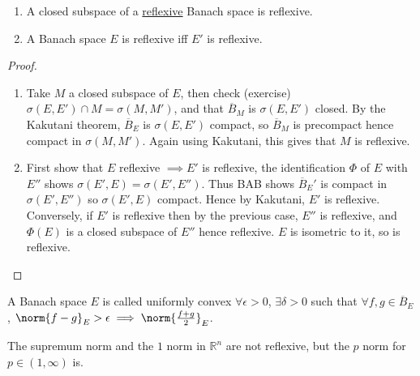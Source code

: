 \documentclass[twoside]{article}
\begin{document}
\begin{cor}\leavevmode
    \begin{enumerate}[label=(\roman*)]
        \item A closed subspace of a \hyperlink{def:refl}{reflexive} Banach space is reflexive.
        \item A Banach space $E$ is reflexive iff $E'$ is reflexive.
    \end{enumerate}
\end{cor}
\begin{proof}\leavevmode
    \begin{enumerate}[label=(\roman*)]
        \item Take $M$ a closed subspace of $E$, then check (exercise) $\sigma(E, E') \cap M = \sigma(M, M')$, and that $\overline{B}_M$ is $\sigma(E, E')$ closed.
            By the Kakutani theorem, $\overline{B}_E$ is $\sigma(E, E')$ compact, so $\overline{B}_M$ is precompact hence compact in $\sigma(M, M')$.
            Again using Kakutani, this gives that $M$ is reflexive.
        \item First show that $E$ reflexive $\implies E'$ is reflexive, the identification $\Phi$ of $E$ with $E''$ shows $\sigma(E', E) = \sigma(E', E'')$.
            Thus BAB shows $\overline{B}_E'$ is compact in $\sigma(E', E'')$ so $\sigma(E', E)$ compact. Hence by Kakutani, $E'$ is reflexive.
            Conversely, if $E'$ is reflexive then by the previous case, $E''$ is reflexive, and $\Phi(E)$ is a closed subspace of $E''$ hence reflexive.
            $E$ is isometric to it, so is reflexive.
    \end{enumerate}
\end{proof}

\begin{defi}
    A Banach space $E$ is called uniformly convex $\forall \epsilon > 0$, $\exists \delta > 0$ such that $\forall f, g \in \overline{B}_E$, $\norm{f-g}_E > \epsilon \implies \norm{\frac{f+g}{2}}_E$.
\end{defi}
\begin{eg}
  The supremum norm and the $1$ norm in $\mathbb{R}^n$ are not reflexive, but the $p$ norm for $p \in (1, \infty)$ is.
\end{eg}
\end{document}
